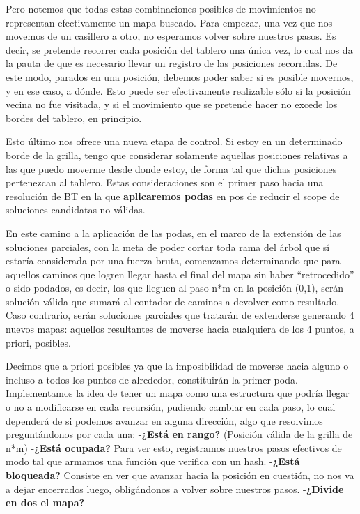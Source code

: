 Pero notemos que todas estas combinaciones posibles de movimientos no representan efectivamente un mapa buscado. Para empezar, una vez que nos movemos de un casillero a otro, no esperamos volver sobre nuestros pasos. Es decir, se pretende recorrer cada posición del tablero una única vez, lo cual nos da la pauta de que es necesario llevar un registro de las posiciones recorridas. 
De este modo, parados en una posición, debemos poder saber si es posible movernos, y en ese caso, a dónde. Esto puede ser efectivamente realizable sólo si la posición vecina no fue visitada, y si el movimiento que se pretende hacer no excede los bordes del tablero, en principio.\newline

Esto último nos ofrece una nueva etapa de control. Si estoy en un determinado borde de la grilla, tengo que considerar solamente aquellas posiciones relativas a las que puedo moverme desde donde estoy, de forma tal que dichas posiciones pertenezcan al tablero. Estas consideraciones son el primer paso hacia una resolución de BT en la que \textbf{aplicaremos podas} en pos de reducir el scope de soluciones candidatas-no válidas. \newline

En este camino a la aplicación de las podas, en el marco de la extensión de las soluciones parciales, con la meta de poder cortar toda rama del árbol que sí estaría considerada por una fuerza bruta, comenzamos determinando que para aquellos caminos que logren llegar hasta el final del mapa sin haber ``retrocedido'' o sido podados, es decir, los que lleguen al paso n*m en la posición (0,1), serán solución válida que sumará al contador de caminos a devolver como resultado.  Caso contrario, serán soluciones parciales que tratarán de extenderse generando 4 nuevos mapas: aquellos resultantes de moverse hacia cualquiera de los 4 puntos, a priori, posibles. \newline


Decimos que a priori posibles ya que la imposibilidad de moverse hacia alguno o incluso a todos los puntos de alrededor, constituirán la primer poda. Implementamos la idea de tener un mapa como una estructura que podría llegar o no a modificarse en cada recursión, pudiendo cambiar en cada paso, lo cual dependerá de si podemos avanzar en alguna dirección, algo que resolvimos preguntándonos por cada una: \newline\newline
-\textbf{¿Está en rango?} (Posición válida de la grilla de n*m)\newline
-\textbf{¿Está ocupada?} Para ver esto, registramos nuestros pasos efectivos de modo tal que armamos una función que verifica con un hash.\newline
-\textbf{¿Está bloqueada?} Consiste en ver que avanzar hacia la posición en cuestión, no nos va a dejar encerrados luego, obligándonos a volver sobre nuestros pasos.\newline
-\textbf{¿Divide en dos el mapa?} \newline\newline

